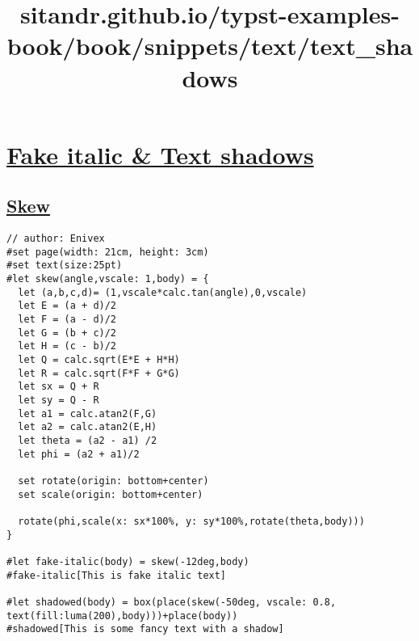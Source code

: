 \title{sitandr.github.io/typst-examples-book/book/snippets/text/text_shadows}

\section{\texorpdfstring{\hyperref[fake-italic--text-shadows]{Fake
italic \& Text
shadows}}{Fake italic \& Text shadows}}\label{fake-italic--text-shadows}

\subsection{\texorpdfstring{\hyperref[skew]{Skew}}{Skew}}\label{skew}

\begin{verbatim}
// author: Enivex
#set page(width: 21cm, height: 3cm)
#set text(size:25pt)
#let skew(angle,vscale: 1,body) = {
  let (a,b,c,d)= (1,vscale*calc.tan(angle),0,vscale)
  let E = (a + d)/2
  let F = (a - d)/2
  let G = (b + c)/2
  let H = (c - b)/2
  let Q = calc.sqrt(E*E + H*H)
  let R = calc.sqrt(F*F + G*G)
  let sx = Q + R
  let sy = Q - R
  let a1 = calc.atan2(F,G)
  let a2 = calc.atan2(E,H)
  let theta = (a2 - a1) /2
  let phi = (a2 + a1)/2

  set rotate(origin: bottom+center)
  set scale(origin: bottom+center)

  rotate(phi,scale(x: sx*100%, y: sy*100%,rotate(theta,body)))
}

#let fake-italic(body) = skew(-12deg,body)
#fake-italic[This is fake italic text]

#let shadowed(body) = box(place(skew(-50deg, vscale: 0.8, text(fill:luma(200),body)))+place(body))
#shadowed[This is some fancy text with a shadow]
\end{verbatim}

\pandocbounded{}
